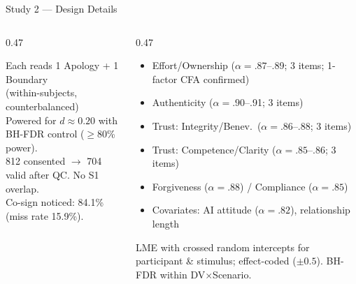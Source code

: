 \documentclass[10pt,aspectratio=169]{beamer}
\begin{document}
\begin{frame}{Study 2 --- Design Details}
\begin{columns}[T]
\begin{column}{0.47\textwidth}
\begin{keybox}
    \footnotesize Each reads 1 Apology + 1 Boundary\\ (within-subjects, counterbalanced)\\[3pt]
    {\scriptsize Powered for $d{\approx}0.20$ with BH-FDR control ($\geq$80\% power).\\
    812 consented $\to$ 704 valid after QC. No S1 overlap.\\
    Co-sign noticed: 84.1\% (miss rate 15.9\%).}
  \end{keybox}
\end{column}
\begin{column}{0.47\textwidth}
  \begin{keybox}
    \begin{itemize}\setlength\itemsep{2pt}
      \item[\faUserCheck] Effort/Ownership ($\alpha{=}.87$--.89; 3 items; 1-factor CFA confirmed)
      \item[\faHeart] Authenticity ($\alpha{=}.90$--.91; 3 items)
      \item[\faLock] Trust: Integrity/Benev.\ ($\alpha{=}.86$--.88; 3 items)
      \item[\faStar] Trust: Competence/Clarity ($\alpha{=}.85$--.86; 3 items)
      \item[\faHandshake] Forgiveness ($\alpha{=}.88$) / Compliance ($\alpha{=}.85$)
      \item[\faCog] Covariates: AI attitude ($\alpha{=}.82$), relationship length
    \end{itemize}
    {\scriptsize LME with crossed random intercepts for participant \& stimulus; effect-coded ($\pm 0.5$). BH-FDR within DV$\times$Scenario.}
  \end{keybox}
\end{column}
\end{columns}
\vspace{4pt}
\begin{center}
\end{center}
\end{frame}
\end{document}
